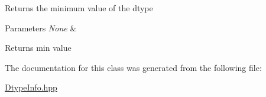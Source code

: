 Returns the minimum value of the dtype


\begin{DoxyParams}{Parameters}
{\em None} & \\
\hline
\end{DoxyParams}
\begin{DoxyReturn}{Returns}
min value 
\end{DoxyReturn}


The documentation for this class was generated from the following file\+:\begin{DoxyCompactItemize}
\item 
\mbox{\hyperlink{_dtype_info_8hpp}{Dtype\+Info.\+hpp}}\end{DoxyCompactItemize}
